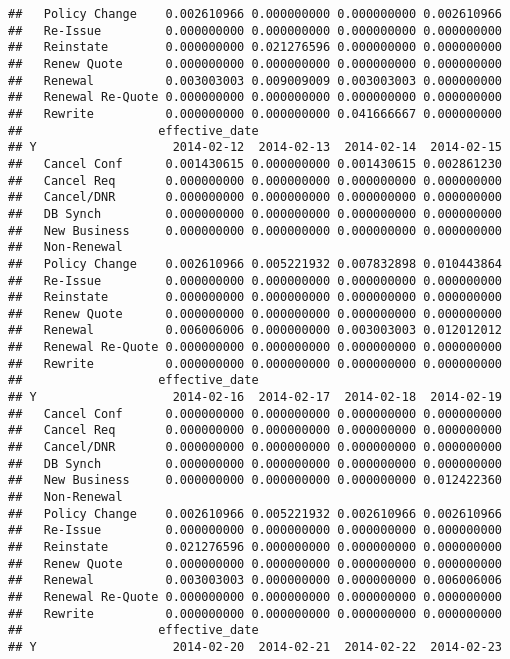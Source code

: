 \documentclass[]{article}
\begin{document}
\begin{verbatim}
##   Policy Change    0.002610966 0.000000000 0.000000000 0.002610966
##   Re-Issue         0.000000000 0.000000000 0.000000000 0.000000000
##   Reinstate        0.000000000 0.021276596 0.000000000 0.000000000
##   Renew Quote      0.000000000 0.000000000 0.000000000 0.000000000
##   Renewal          0.003003003 0.009009009 0.003003003 0.000000000
##   Renewal Re-Quote 0.000000000 0.000000000 0.000000000 0.000000000
##   Rewrite          0.000000000 0.000000000 0.041666667 0.000000000
##                   effective_date
## Y                   2014-02-12  2014-02-13  2014-02-14  2014-02-15
##   Cancel Conf      0.001430615 0.000000000 0.001430615 0.002861230
##   Cancel Req       0.000000000 0.000000000 0.000000000 0.000000000
##   Cancel/DNR       0.000000000 0.000000000 0.000000000 0.000000000
##   DB Synch         0.000000000 0.000000000 0.000000000 0.000000000
##   New Business     0.000000000 0.000000000 0.000000000 0.000000000
##   Non-Renewal                                                     
##   Policy Change    0.002610966 0.005221932 0.007832898 0.010443864
##   Re-Issue         0.000000000 0.000000000 0.000000000 0.000000000
##   Reinstate        0.000000000 0.000000000 0.000000000 0.000000000
##   Renew Quote      0.000000000 0.000000000 0.000000000 0.000000000
##   Renewal          0.006006006 0.000000000 0.003003003 0.012012012
##   Renewal Re-Quote 0.000000000 0.000000000 0.000000000 0.000000000
##   Rewrite          0.000000000 0.000000000 0.000000000 0.000000000
##                   effective_date
## Y                   2014-02-16  2014-02-17  2014-02-18  2014-02-19
##   Cancel Conf      0.000000000 0.000000000 0.000000000 0.000000000
##   Cancel Req       0.000000000 0.000000000 0.000000000 0.000000000
##   Cancel/DNR       0.000000000 0.000000000 0.000000000 0.000000000
##   DB Synch         0.000000000 0.000000000 0.000000000 0.000000000
##   New Business     0.000000000 0.000000000 0.000000000 0.012422360
##   Non-Renewal                                                     
##   Policy Change    0.002610966 0.005221932 0.002610966 0.002610966
##   Re-Issue         0.000000000 0.000000000 0.000000000 0.000000000
##   Reinstate        0.021276596 0.000000000 0.000000000 0.000000000
##   Renew Quote      0.000000000 0.000000000 0.000000000 0.000000000
##   Renewal          0.003003003 0.000000000 0.000000000 0.006006006
##   Renewal Re-Quote 0.000000000 0.000000000 0.000000000 0.000000000
##   Rewrite          0.000000000 0.000000000 0.000000000 0.000000000
##                   effective_date
## Y                   2014-02-20  2014-02-21  2014-02-22  2014-02-23

\end{verbatim}
\end{document}
